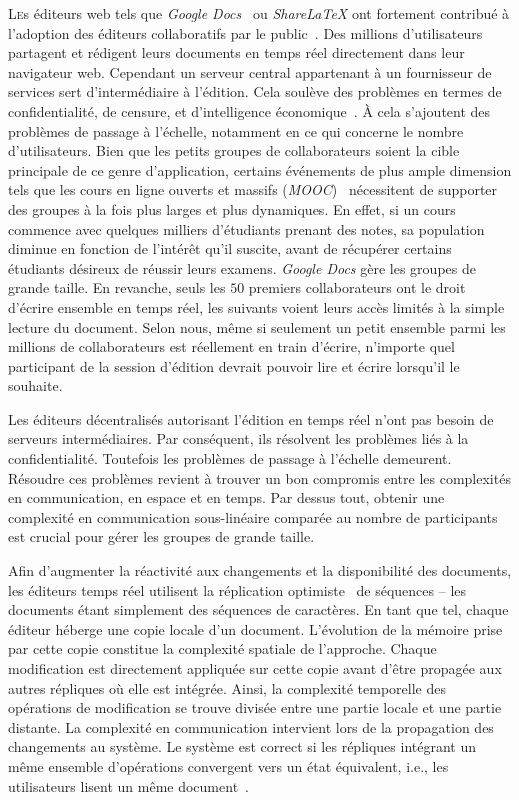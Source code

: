 
\lettrine{L}es éditeurs web tels que \emph{Google Docs}~\cite{googledocs} ou
\emph{ShareLaTeX}\cite{sharelatex} ont fortement contribué à l'adoption des
éditeurs collaboratifs par le public~\cite{mogan2010impact}. Des millions
d'utilisateurs partagent et rédigent leurs documents en temps réel directement
dans leur navigateur web. Cependant un serveur central appartenant à un
fournisseur de services sert d'intermédiaire à l'édition. Cela soulève des
problèmes en termes de confidentialité, de censure, et d'intelligence
économique~\cite{cherrueau2016composer, gellman2013us, pearson2011toward}. À
cela s'ajoutent des problèmes de passage à l'échelle, notamment en ce qui
concerne le nombre d'utilisateurs. Bien que les petits groupes de collaborateurs
soient la cible principale de ce genre d'application, certains événements de
plus ample dimension tels que les cours en ligne ouverts et massifs
(\emph{MOOC})~\cite{breslow2013studying} nécessitent de supporter des groupes à
la fois plus larges et plus dynamiques. En effet, si un cours commence avec
quelques milliers d'étudiants prenant des notes, sa population diminue en
fonction de l'intérêt qu'il suscite, avant de récupérer certains étudiants
désireux de réussir leurs examens. \emph{Google Docs} gère les groupes de grande
taille. En revanche, seuls les $50$ premiers collaborateurs ont le droit
d'écrire ensemble en temps réel, les suivants voient leurs accès limités à la
simple lecture du document. Selon nous, même si seulement un petit ensemble
parmi les millions de collaborateurs est réellement en train d'écrire, n'importe
quel participant de la session d'édition devrait pouvoir lire et écrire
lorsqu'il le souhaite.

Les éditeurs décentralisés autorisant l'édition en temps réel n'ont pas besoin
de serveurs intermédiaires. Par conséquent, ils résolvent les problèmes liés à
la confidentialité. Toutefois les problèmes de passage à l'échelle
demeurent. Résoudre ces problèmes revient à trouver un bon compromis entre les
complexités en communication, en espace et en temps. Par dessus tout, obtenir
une complexité en communication sous-linéaire comparée au nombre de participants
est crucial pour gérer les groupes de grande taille.

Afin d'augmenter la réactivité aux changements et la disponibilité des
documents, les éditeurs temps réel utilisent la réplication
optimiste~\cite{demers1987epidemic, ladin1992providing, saito2005optimistic,
sun1998achieving} de séquences -- les documents étant simplement des séquences
de caractères. En tant que tel, chaque éditeur héberge une copie locale d'un
document. L'évolution de la mémoire prise par cette copie constitue la
complexité spatiale de l'approche. Chaque modification est directement appliquée
sur cette copie avant d'être propagée aux autres répliques où elle est
intégrée. Ainsi, la complexité temporelle des opérations de modification se
trouve divisée entre une partie locale et une partie distante. La complexité en
communication intervient lors de la propagation des changements au système. Le
système est correct si les répliques intégrant un même ensemble d'opérations
convergent vers un état équivalent, i.e., les utilisateurs lisent un même
document~\cite{bailis2013eventual, shapiro2011conflict}.

